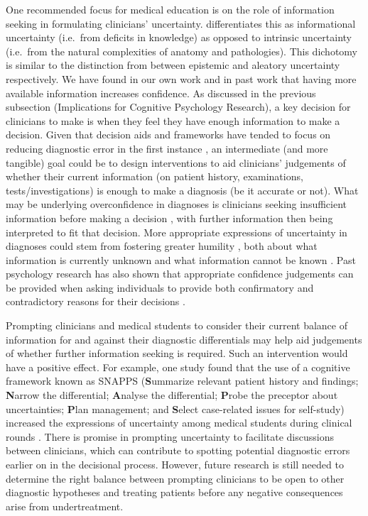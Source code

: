 \documentclass[a4paper, nobind]{templates/ociamthesis}
\begin{document}
One recommended focus for medical education is on the role of information seeking in formulating clinicians' uncertainty. \textcite{wray_diagnosis_2015} differentiates this as informational uncertainty (i.e.~from deficits in knowledge) as opposed to intrinsic uncertainty (i.e.~from the natural complexities of anatomy and pathologies). This dichotomy is similar to the distinction from \textcite{ülkümen2016} between epistemic and aleatory uncertainty respectively. We have found in our own work and in past work \autocite{gruppen_information_1991,ko_divergent_2022} that having more available information increases confidence. As discussed in the previous subsection (Implications for Cognitive Psychology Research), a key decision for clinicians to make is when they feel they have enough information to make a decision. Given that decision aids and frameworks have tended to focus on reducing diagnostic error in the first instance \autocite{dave_interventions_2022}, an intermediate (and more tangible) goal could be to design interventions to aid clinicians' judgements of whether their current information (on patient history, examinations, tests/investigations) is enough to make a diagnosis (be it accurate or not). What may be underlying overconfidence in diagnoses is clinicians seeking insufficient information before making a decision \autocite{meyer_calibrating_2017}, with further information then being interpreted to fit that decision. More appropriate expressions of uncertainty in diagnoses could stem from fostering greater humility \autocite{fischer_intellectual_2024}, both about what information is currently unknown and what information cannot be known \autocite{gehlbach_illusion_2024}. Past psychology research has also shown that appropriate confidence judgements can be provided when asking individuals to provide both confirmatory and contradictory reasons for their decisions \autocite{koriat_reasons_1980}.

\hfill\break
Prompting clinicians and medical students to consider their current balance of information for and against their diagnostic differentials may help aid judgements of whether further information seeking is required. Such an intervention would have a positive effect. For example, one study found that the use of a cognitive framework known as SNAPPS (\textbf{S}ummarize relevant patient history and findings; \textbf{N}arrow the differential; \textbf{A}nalyse the differential; \textbf{P}robe the preceptor about uncertainties; \textbf{P}lan management; and \textbf{S}elect case-related issues for self-study) increased the expressions of uncertainty among medical students during clinical rounds \autocite{wolpaw_student_2012}. There is promise in prompting uncertainty to facilitate discussions between clinicians, which can contribute to spotting potential diagnostic errors earlier on in the decisional process. However, future research is still needed to determine the right balance between prompting clinicians to be open to other diagnostic hypotheses and treating patients before any negative consequences arise from undertreatment.\\
\end{document}
